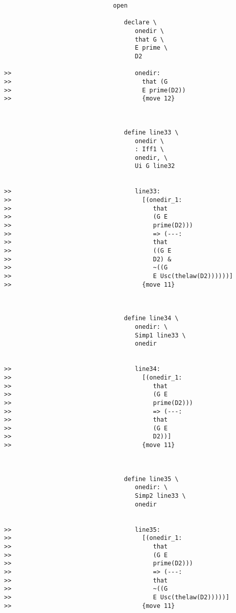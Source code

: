 \documentclass[12pt]{article}
\begin{document}
\begin{verbatim}
                              open

                                 declare \
                                    onedir \
                                    that G \
                                    E prime \
                                    D2

>>                                  onedir:
>>                                    that (G
>>                                    E prime(D2))
>>                                    {move 12}



                                 define line33 \
                                    onedir \
                                    : Iff1 \
                                    onedir, \
                                    Ui G line32


>>                                  line33:
>>                                    [(onedir_1:
>>                                       that
>>                                       (G E
>>                                       prime(D2)))
>>                                       => (---:
>>                                       that
>>                                       ((G E
>>                                       D2) &
>>                                       ~((G
>>                                       E Usc(thelaw(D2))))))]
>>                                    {move 11}



                                 define line34 \
                                    onedir: \
                                    Simp1 line33 \
                                    onedir


>>                                  line34:
>>                                    [(onedir_1:
>>                                       that
>>                                       (G E
>>                                       prime(D2)))
>>                                       => (---:
>>                                       that
>>                                       (G E
>>                                       D2))]
>>                                    {move 11}



                                 define line35 \
                                    onedir: \
                                    Simp2 line33 \
                                    onedir


>>                                  line35:
>>                                    [(onedir_1:
>>                                       that
>>                                       (G E
>>                                       prime(D2)))
>>                                       => (---:
>>                                       that
>>                                       ~((G
>>                                       E Usc(thelaw(D2)))))]
>>                                    {move 11}




\end{verbatim}
\end{document}

